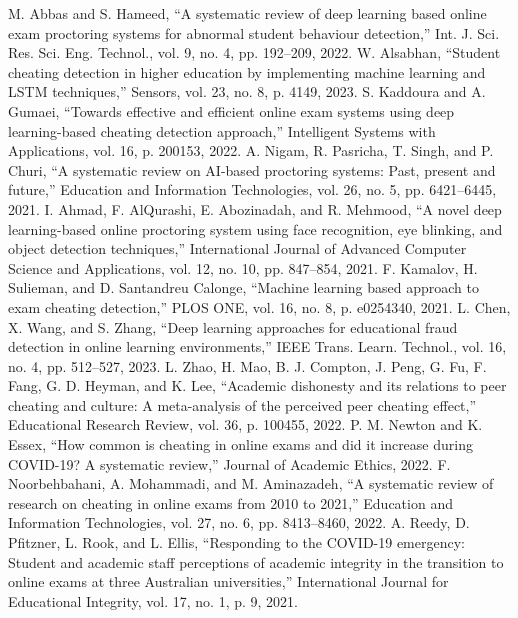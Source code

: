 \documentclass[conference]{IEEEtran}
\begin{document}
\begin{thebibliography}{23}
 M. Abbas and S. Hameed, ``A systematic review of deep learning based online exam proctoring systems for abnormal student behaviour detection,'' Int. J. Sci. Res. Sci. Eng. Technol., vol. 9, no. 4, pp. 192--209, 2022.
 W. Alsabhan, ``Student cheating detection in higher education by implementing machine learning and LSTM techniques,'' Sensors, vol. 23, no. 8, p. 4149, 2023.
 S. Kaddoura and A. Gumaei, ``Towards effective and efficient online exam systems using deep learning-based cheating detection approach,'' Intelligent Systems with Applications, vol. 16, p. 200153, 2022.
 A. Nigam, R. Pasricha, T. Singh, and P. Churi, ``A systematic review on AI-based proctoring systems: Past, present and future,'' Education and Information Technologies, vol. 26, no. 5, pp. 6421--6445, 2021.
 I. Ahmad, F. AlQurashi, E. Abozinadah, and R. Mehmood, ``A novel deep learning-based online proctoring system using face recognition, eye blinking, and object detection techniques,'' International Journal of Advanced Computer Science and Applications, vol. 12, no. 10, pp. 847--854, 2021.
 F. Kamalov, H. Sulieman, and D. Santandreu Calonge, ``Machine learning based approach to exam cheating detection,'' PLOS ONE, vol. 16, no. 8, p. e0254340, 2021.
 L. Chen, X. Wang, and S. Zhang, ``Deep learning approaches for educational fraud detection in online learning environments,'' IEEE Trans. Learn. Technol., vol. 16, no. 4, pp. 512--527, 2023.
 L. Zhao, H. Mao, B. J. Compton, J. Peng, G. Fu, F. Fang, G. D. Heyman, and K. Lee, ``Academic dishonesty and its relations to peer cheating and culture: A meta-analysis of the perceived peer cheating effect,'' Educational Research Review, vol. 36, p. 100455, 2022.
 P. M. Newton and K. Essex, ``How common is cheating in online exams and did it increase during COVID-19? A systematic review,'' Journal of Academic Ethics, 2022.
 F. Noorbehbahani, A. Mohammadi, and M. Aminazadeh, ``A systematic review of research on cheating in online exams from 2010 to 2021,'' Education and Information Technologies, vol. 27, no. 6, pp. 8413--8460, 2022.
 A. Reedy, D. Pfitzner, L. Rook, and L. Ellis, ``Responding to the COVID-19 emergency: Student and academic staff perceptions of academic integrity in the transition to online exams at three Australian universities,'' International Journal for Educational Integrity, vol. 17, no. 1, p. 9, 2021.

\end{thebibliography}
\end{document}
